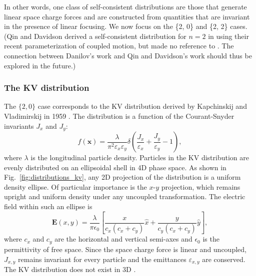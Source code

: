 In other words, one class of self-consistent distributions are those that generate linear space charge forces and are constructed from quantities that are invariant in the presence of linear focusing. We now focus on the \{2, 0\} and \{2, 2\} cases. (Qin and Davidson derived a self-consistent distribution for $n = 2$ in \cite{Qin2013} using their recent parameterization of coupled motion, but made no reference to \cite{Danilov2003}. The connection between Danilov's work and Qin and Davidson's work should thus be explored in the future.)


\subsubsection{The KV distribution}

The $\{2, 0\}$ case corresponds to the KV distribution derived by Kapchinskij and Vladimirskij in 1959 \cite{Kapchinskij1959}. The distribution is a function of the Courant-Snyder invariants $J_x$ and $J_y$:
%
\begin{equation}
    f(\mathbf{x}) = \frac{\lambda}{\pi^2 \varepsilon_x\varepsilon_y}
    \delta \left(\frac{J_x}{\varepsilon_x} + \frac{J_y}{\varepsilon_y} -1 \right),
\end{equation}
%
where $\lambda$ is the longitudinal particle density. Particles in the KV distribution are evenly distributed on an ellipsoidal shell in 4D phase space. As shown in Fig.~\ref{fig:distributions_kv}, any 2D projection of the distribution is a uniform density ellipse. Of particular importance is the $x$-$y$ projection, which remains upright and uniform density under any uncoupled transformation. The electric field within such an ellipse is
%
\begin{equation}  \label{eq:field_in_upright_ellipse}
    \mathbf{E}(x, y) =
    \frac{\lambda}{\pi\epsilon_0}
    \left[ 
        \frac{x}{c_x\left(c_x+c_y\right)} \hat{x}
        + \frac{y}{c_y\left(c_x+c_y\right)} \hat{y}
    \right],
\end{equation}
%
where $c_x$ and $c_y$ are the horizontal and vertical semi-axes and $\epsilon_0$ is the permittivity of free space. Since the space charge force is linear and uncoupled, $J_{x,y}$ remains invariant for every particle and the emittances $\varepsilon_{x,y}$ are conserved. The KV distribution does not exist in 3D \cite{Sacherer1968}.

